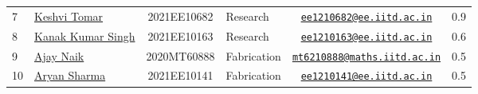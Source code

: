 \documentclass[table]{rapportCS}
\begin{document}
\begin{table}[h]
\begin{tabular}{|p{.3cm}|p{3cm}|c|p{2.7cm}|c|c|}
7 & \href{https://www.linkedin.com/in/keshvi-tomer-4b0331236/}{Keshvi Tomar} & 2021EE10682 & Research & \href{mailto:ee1210682@ee.iitd.ac.in}{\nolinkurl{ee1210682@ee.iitd.ac.in}} & 0.9 \\
8 & \href{https://www.linkedin.com/in/kanak-kumar-538ab2247/}{Kanak Kumar Singh} & 2021EE10163 & Research & \href{mailto:ee1210163@ee.iitd.ac.in}{\nolinkurl{ee1210163@ee.iitd.ac.in}} & 0.6 \\ 
9 & \href{https://www.linkedin.com/in/ajay-ramavath-/}{Ajay Naik} &
2020MT60888 & Fabrication  &
\href{mailto:mt6210888@maths.iitd.ac.in}{\nolinkurl{mt6210888@maths.iitd.ac.in}}
& 0.5 \\
10 & \href{https://www.linkedin.com/in/aryan-sharma-326657230/}{Aryan
Sharma} & 2021EE10141 & Fabrication  &
\href{mailto:ee1210141@ee.iitd.ac.in}{\nolinkurl{ee1210141@ee.iitd.ac.in}}
& 0.5 \\

\hline
\end{tabular}

\end{table}
\end{document}
